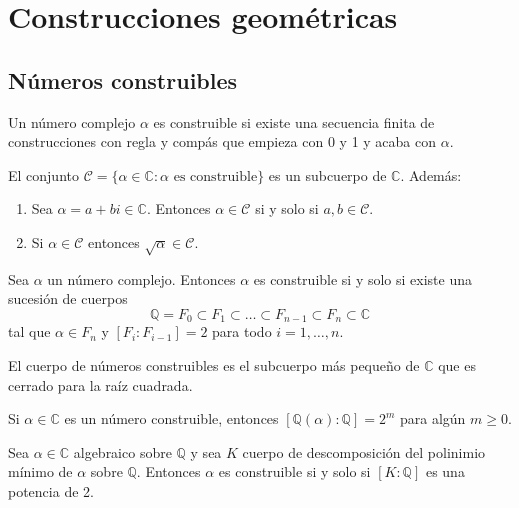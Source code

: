 \chapter{Construcciones geométricas}
\section{Números construibles}

\begin{definition}
    Un número complejo $\alpha$ es construible si existe una  secuencia finita de construcciones con regla y compás que empieza con 0 y 1 y acaba con $\alpha$.
\end{definition}

\begin{proposition}
    El conjunto $\mathcal{C} = \{ \alpha \in \mathbb{C} : \alpha \text{ es construible} \}$ es un subcuerpo de $\mathbb{C}$. Además:
    \begin{enumerate}
        \item Sea $\alpha = a + bi \in \mathbb{C}$. Entonces $\alpha \in \mathcal{C}$ si y solo si $a, b \in \mathcal{C}$.
        \item Si $\alpha \in \mathcal{C}$ entonces $\sqrt{\alpha} \in \mathcal{C}$.
    \end{enumerate}
\end{proposition}

\begin{theorem}
    Sea $\alpha$ un número complejo. Entonces $\alpha$ es construible si y solo si existe una sucesión de cuerpos
    $$\mathbb{Q} = F_0 \subset F_1 \subset \dots \subset F_{n-1} \subset F_n \subset \mathbb{C}$$
    tal que $\alpha \in F_n$ y $[F_i : F_{i-1}] = 2$ para todo $i = 1, \dots, n$.
\end{theorem}

\begin{corollary}
    El cuerpo de números construibles es el subcuerpo más pequeño de $\mathbb{C}$ que es cerrado para la raíz cuadrada.
\end{corollary}

\begin{corollary}
    Si $\alpha \in \mathbb{C}$ es un número construible, entonces $[\mathbb{Q}(\alpha) : \mathbb{Q}] = 2^m$ para algún $m \geq 0$.
\end{corollary}

\begin{theorem}
    Sea $\alpha \in \mathbb{C}$ algebraico sobre $\mathbb{Q}$ y sea $K$ cuerpo de descomposición del polinimio mínimo de $\alpha$ sobre $\mathbb{Q}$.
    Entonces $\alpha$ es construible si y solo si $[K : \mathbb{Q}]$ es una potencia de 2.
\end{theorem}

